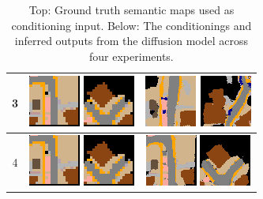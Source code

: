 \documentclass{article}
\begin{document}
\begin{table}
\begin{tabular}{c | c | c}
3 &
\includegraphics[width=0.15\linewidth]{images/val_conditioning1_exp3.png}
\includegraphics[width=0.15\linewidth]{images/val_conditioning2_exp3.png}
&
\includegraphics[width=0.15\linewidth]{images/val_inferred1_exp3.png}
\includegraphics[width=0.15\linewidth]{images/val_inferred2_exp3.png}
\\
\midrule

4 &
\includegraphics[width=0.15\linewidth]{images/val_conditioning1_exp4.png}
\includegraphics[width=0.15\linewidth]{images/val_conditioning2_exp4.png}
&
\includegraphics[width=0.15\linewidth]{images/val_inferred1_exp4.png}
\includegraphics[width=0.15\linewidth]{images/val_inferred2_exp4.png}
\\

\bottomrule
\end{tabular}
\caption*{Top: Ground truth semantic maps used as conditioning input. Below: The conditionings and inferred outputs from the diffusion model across four experiments.}
\label{tab:validation_results}
\end{table}
\end{document}
